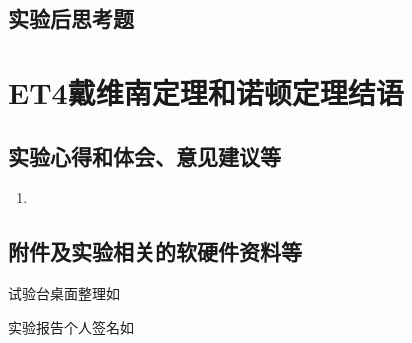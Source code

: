 \documentclass[dvipsnames, svgnames,a4paper,11pt]{article}
\begin{document}
	\subsubsection{}
	
	
	\subsection{实验后思考题}
	
	\begin{question}
		
	\end{question}
	
	\begin{question}
		
	\end{question}
	
	\begin{question}
		
	\end{question}
	
	
	
	\clearpage
	
	\section{ET4戴维南定理和诺顿定理\quad\heiti 结语}
	
	\subsection{实验心得和体会、意见建议等}
	\begin{enumerate}
		\item 
	\end{enumerate}
	

	\subsection{附件及实验相关的软硬件资料等}
	试验台桌面整理如%
	
	实验报告个人签名如

	
	
\end{document}
